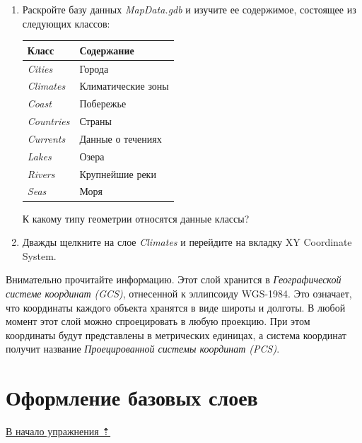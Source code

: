 \documentclass[12pt,]{book}
\begin{document}
\begin{enumerate}
\def\labelenumi{\arabic{enumi}.}
\setcounter{enumi}{2}
\item
  Раскройте базу данных \emph{MapData.gdb} и изучите ее содержимое, состоящее из следующих классов:

  \begin{longtable}[]{@{}ll@{}}
  \toprule
  \textbf{Класс} & \textbf{Содержание}\tabularnewline
  \midrule
  \endhead
  \emph{Cities} & Города\tabularnewline
  \emph{Climates} & Климатические зоны\tabularnewline
  \emph{Coast} & Побережье\tabularnewline
  \emph{Countries} & Страны\tabularnewline
  \emph{Currents} & Данные о течениях\tabularnewline
  \emph{Lakes} & Озера\tabularnewline
  \emph{Rivers} & Крупнейшие реки\tabularnewline
  \emph{Seas} & Моря\tabularnewline
  \bottomrule
  \end{longtable}

  К какому типу геометрии относятся данные классы?
\item
  Дважды щелкните на слое \emph{Climates} и перейдите на вкладку XY Coordinate System.
\end{enumerate}

Внимательно прочитайте информацию. Этот слой хранится в \emph{Географической
системе координат (GCS)}, отнесенной к эллипсоиду WGS-1984. Это
означает, что координаты каждого объекта хранятся в виде широты и
долготы. В любой момент этот слой можно спроецировать в любую проекцию.
При этом координаты будут представлены в метрических единицах, а система
координат получит название \emph{Проецированной системы координат (PCS)}.

\hypertarget{map-design-climates-basic}{%
\section{Оформление базовых слоев}\label{map-design-climates-basic}}

\protect\hyperlink{map-design-climates}{В начало упражнения ⇡}
\end{document}
